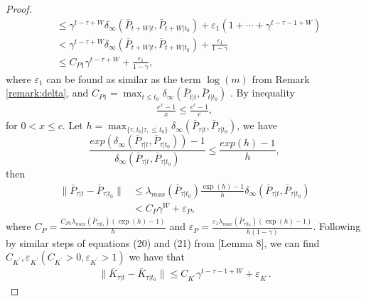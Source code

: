 \documentclass{article}
\begin{document}
\begin{proof}
\begin{align*}
        &\leq \gamma^{t-\tau+W}\delta_{\infty}(\bar{P}_{t+W|t},\bar{P}_{t+W|t_{0}}) + \varepsilon_{1}(1+\cdots+\gamma^{t-\tau-1+W})\\
        &< \gamma^{t-\tau+W}\delta_{\infty}(\bar{P}_{t+W|t},\bar{P}_{t+W|t_{0}}) + \frac{\varepsilon_{1}}{1-\gamma}\\
        &\leq C_{P1}\gamma^{t-\tau+W}+\frac{\varepsilon_{1}}{1-\gamma},
    \end{align*}
    where $\varepsilon_{1}$ can be found as similar as the term $\log(m)$ from Remark \ref{remark:delta}, and $C_{P1} = \max_{t\leq t_{0}} \delta_{\infty}(\bar{P}_{t|t},\bar{P}_{t|t_{0}})$ . By inequality
    \begin{align*}
        \frac{e^{x}-1}{x} \leq \frac{e^{c}-1}{c},
    \end{align*}
    for $0 < x \leq c$. Let $h = \max_{\{\tau,t_{0}| \tau,\leq t_{0}\}} \delta_{\infty}(\bar{P}_{\tau|t},\bar{P}_{\tau|t_{0}})$, we have
    \begin{equation}
        \frac{exp(\delta_{\infty}(\bar{P}_{\tau|t},\bar{P}_{\tau|t_{0}}))-1}{\delta_{\infty}(\bar{P}_{\tau|t},\bar{P}_{\tau|t_{0}})} \leq \frac{exp(h)-1}{h},
    \end{equation}
    then
    \begin{align*}
        \|\bar{P}_{\tau|t}-\bar{P}_{\tau|t_{0}}\| &\leq \lambda_{max}(\bar{P}_{\tau|t_{0}})\frac{\exp(h)-1}{h}\delta_{\infty}(\bar{P}_{\tau|t},\bar{P}_{\tau|t_{0}})\\
        &< C_{P}\gamma^{W}+\varepsilon_{P},
    \end{align*}
    where $C_{P} = \frac{C_{P1}\lambda_{max}(\bar{P}_{\tau|t_{0}})(\exp(h)-1)}{h}$ and $\varepsilon_{P} = \frac{\varepsilon_{1}\lambda_{max}(\bar{P}_{\tau|t_{0}})(\exp(h)-1)}{h(1-\gamma)}$. Following by similar steps of equations (20) and (21) from \cite{chen_regret_2022}[Lemma 8], we can find $C_{K^{'}},\varepsilon_{K^{'}}(C_{K^{'}}>0,\varepsilon_{K^{'}}>1)$ we have that
    \begin{align*}
        \|\bar{K}_{\tau|t}-\bar{K}_{\tau|t_{0}}\| \leq C_{K^{'}}\gamma^{t-\tau-1+W}+\varepsilon_{K^{'}}.
    \end{align*}
\end{proof}
\end{document}
